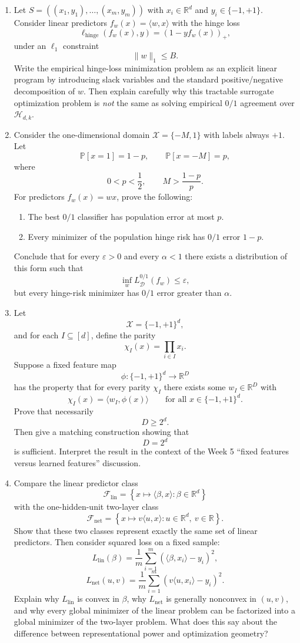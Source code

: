 \documentclass{article}
\begin{document}
\begin{enumerate}
\item Let $S=((x_1,y_1),\dots,(x_m,y_m))$ with $x_i\in\mathbb{R}^d$ and $y_i\in\{-1,+1\}$. Consider linear predictors $f_w(x)=\langle w,x\rangle$ with the hinge loss
$$
\ell_{\mathrm{hinge}}(f_w(x),y)=(1-yf_w(x))_+,
$$
under an $\ell_1$ constraint
$$
\|w\|_1 \le B.
$$
Write the empirical hinge-loss minimization problem as an explicit linear program by introducing slack variables and the standard positive/negative decomposition of $w$. Then explain carefully why this tractable surrogate optimization problem is \emph{not} the same as solving empirical $0/1$ agreement over $\mathcal{H}_{d,k}$.

\item Consider the one-dimensional domain $\mathcal{X}=\{-M,1\}$ with labels always $+1$. Let
$$
\mathbb{P}[x=1]=1-p,
\qquad
\mathbb{P}[x=-M]=p,
$$
where
$$
0<p<\frac12,
\qquad
M>\frac{1-p}{p}.
$$
For predictors $f_w(x)=wx$, prove the following:
\begin{enumerate}
\item The best $0/1$ classifier has population error at most $p$.
\item Every minimizer of the population hinge risk has $0/1$ error $1-p$.
\end{enumerate}
Conclude that for every $\varepsilon>0$ and every $\alpha<1$ there exists a distribution of this form such that
$$
\inf_w L^{0/1}_{\mathcal{D}}(f_w)\le \varepsilon,
$$
but every hinge-risk minimizer has $0/1$ error greater than $\alpha$.

\item Let
$$
\mathcal{X}=\{-1,+1\}^d,
$$
and for each $I\subseteq[d]$, define the parity
$$
\chi_I(x)=\prod_{i\in I}x_i.
$$
Suppose a fixed feature map
$$
\phi:\{-1,+1\}^d \to \mathbb{R}^D
$$
has the property that for every parity $\chi_I$ there exists some $w_I\in\mathbb{R}^D$ with
$$
\chi_I(x)=\langle w_I,\phi(x)\rangle
\qquad
\text{for all } x\in\{-1,+1\}^d.
$$
Prove that necessarily
$$
D\ge 2^d.
$$
Then give a matching construction showing that
$$
D=2^d
$$
is sufficient. Interpret the result in the context of the Week 5 ``fixed features versus learned features'' discussion.

\item Compare the linear predictor class
$$
\mathcal{F}_{\mathrm{lin}}
=
\left\{
x \mapsto \langle \beta,x\rangle : \beta\in\mathbb{R}^d
\right\}
$$
with the one-hidden-unit two-layer class
$$
\mathcal{F}_{\mathrm{net}}
=
\left\{
x \mapsto v\langle u,x\rangle : u\in\mathbb{R}^d,\ v\in\mathbb{R}
\right\}.
$$
Show that these two classes represent exactly the same set of linear predictors. Then consider squared loss on a fixed sample:
$$
L_{\mathrm{lin}}(\beta)=\frac1m \sum_{i=1}^m (\langle \beta,x_i\rangle-y_i)^2,
$$
$$
L_{\mathrm{net}}(u,v)=\frac1m \sum_{i=1}^m (v\langle u,x_i\rangle-y_i)^2.
$$
Explain why $L_{\mathrm{lin}}$ is convex in $\beta$, why $L_{\mathrm{net}}$ is generally nonconvex in $(u,v)$, and why every global minimizer of the linear problem can be factorized into a global minimizer of the two-layer problem. What does this say about the difference between representational power and optimization geometry?
\end{enumerate}
\end{document}
